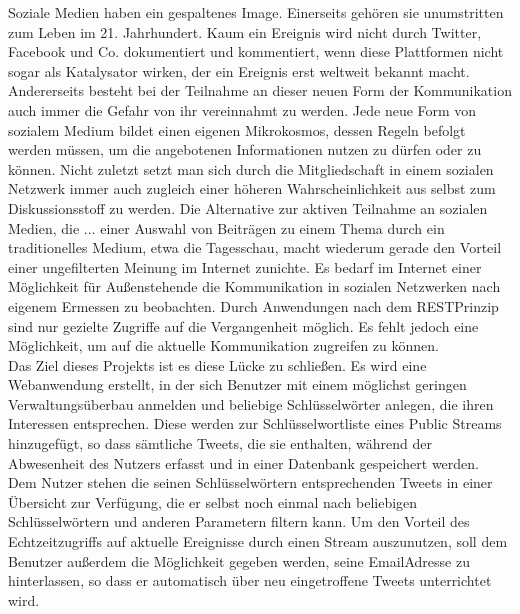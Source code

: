 Soziale Medien haben ein gespaltenes Image. Einerseits gehören sie unumstritten zum Leben im
21. Jahrhundert. Kaum ein Ereignis wird nicht durch Twitter, Facebook und Co. dokumentiert und
kommentiert, wenn diese Plattformen nicht sogar als Katalysator wirken, der ein Ereignis erst
weltweit bekannt macht. Andererseits besteht bei der Teilnahme an dieser neuen Form der
Kommunikation auch immer die Gefahr von ihr vereinnahmt zu werden. Jede neue Form von
sozialem Medium bildet einen eigenen Mikrokosmos, dessen Regeln befolgt werden müssen, um
die angebotenen Informationen nutzen zu dürfen oder zu können. Nicht zuletzt setzt man sich
durch die Mitgliedschaft in einem sozialen Netzwerk immer auch zugleich einer höheren
Wahrscheinlichkeit aus selbst zum Diskussionsstoff zu werden. Die Alternative zur aktiven
Teilnahme an sozialen Medien, die ... einer Auswahl von Beiträgen zu einem Thema durch ein
traditionelles Medium, etwa die Tagesschau, macht wiederum gerade den Vorteil einer
ungefilterten Meinung im Internet zunichte. Es bedarf im Internet einer Möglichkeit für
Außenstehende die Kommunikation in sozialen Netzwerken nach eigenem Ermessen zu
beobachten. Durch Anwendungen nach dem REST­Prinzip sind nur gezielte Zugriffe auf die
Vergangenheit möglich. Es fehlt jedoch eine Möglichkeit, um auf die aktuelle Kommunikation
zugreifen zu können.\\
Das Ziel dieses Projekts ist es diese Lücke zu schließen. Es wird eine Webanwendung erstellt, in
der sich Benutzer mit einem möglichst geringen Verwaltungsüberbau anmelden und beliebige
Schlüsselwörter anlegen, die ihren Interessen entsprechen. Diese werden zur Schlüsselwortliste
eines Public Streams hinzugefügt, so dass sämtliche Tweets, die sie enthalten, während der
Abwesenheit des Nutzers erfasst und in einer Datenbank gespeichert werden. Dem Nutzer stehen
die seinen Schlüsselwörtern entsprechenden Tweets in einer Übersicht zur Verfügung, die er selbst
noch einmal nach beliebigen Schlüsselwörtern und anderen Parametern filtern kann. Um den
Vorteil des Echtzeitzugriffs auf aktuelle Ereignisse durch einen Stream auszunutzen, soll dem
Benutzer außerdem die Möglichkeit gegeben werden, seine Email­Adresse zu hinterlassen, so dass
er automatisch über neu eingetroffene Tweets unterrichtet wird.


